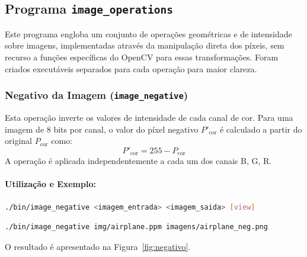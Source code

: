 \documentclass[a4paper, 11pt, portuguese]{article}
\begin{document}
\subsection{Programa \texttt{image\_operations}}

Este programa engloba um conjunto de operações geométricas e de intensidade sobre imagens, implementadas através da manipulação direta dos píxeis, sem recurso a funções específicas do OpenCV para essas transformações. Foram criados executáveis separados para cada operação para maior clareza.

\subsubsection{Negativo da Imagem (\texttt{image\_negative})}
Esta operação inverte os valores de intensidade de cada canal de cor. Para uma imagem de 8 bits por canal, o valor do píxel negativo $P'_{\text{cor}}$ é calculado a partir do original $P_{\text{cor}}$ como:
$$ P'_{\text{cor}} = 255 - P_{\text{cor}} $$
A operação é aplicada independentemente a cada um dos canais B, G, R.

\paragraph{Utilização e Exemplo:}
\begin{lstlisting}[language=bash, caption=Sintaxe de Uso do image\_negative]
./bin/image_negative <imagem_entrada> <imagem_saida> [view]
\end{lstlisting}
\begin{lstlisting}[language=bash]
./bin/image_negative img/airplane.ppm imagens/airplane_neg.png
\end{lstlisting}
O resultado é apresentado na Figura~\ref{fig:negativo}.
\end{document}
